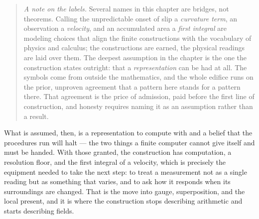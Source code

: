\begin{quote}
\emph{A note on the labels.} Several names in this chapter are bridges, not theorems. Calling the
unpredictable onset of slip a \emph{curvature term}, an observation a \emph{velocity}, and an
accumulated area a \emph{first integral} are modeling choices that align the finite constructions with
the vocabulary of physics and calculus; the constructions are earned, the physical readings are laid
over them. The deepest assumption in the chapter is the one the construction states outright: that a
\emph{representation} can be had at all. The symbols come from outside the mathematics, and the whole
edifice runs on the prior, unproven agreement that a pattern here stands for a pattern there. That
agreement is the price of admission, paid before the first line of construction, and honesty requires
naming it as an assumption rather than a result.
\end{quote}

What is assumed, then, is a representation to compute with and a belief that the procedures run will
halt --- the two things a finite computer cannot give itself and must be handed. With those granted,
the construction has computation, a resolution floor, and the first integral of a velocity, which is
precisely the equipment needed to take the next step: to treat a measurement not as a single reading
but as something that varies, and to ask how it responds when its surroundings are changed. That is
the move into gauge, superposition, and the local present, and it is where the construction stops
describing arithmetic and starts describing fields.
